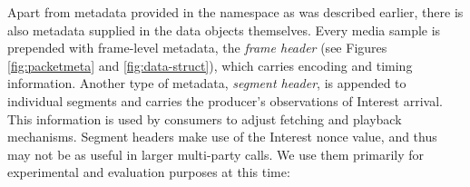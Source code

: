 \documentclass{icn/sig-alternate-2013} %
\newcommand{\ndnrtcName}{NDN-RTC} %
\begin{document}
Apart from metadata provided in the namespace as was described earlier, there is also metadata supplied in the data objects themselves.
%
Every media sample is prepended with frame-level metadata, the \textit{frame header} (see Figures \ref{fig:packetmeta} and \ref{fig:data-struct}), which carries encoding and timing information. %
Another type of metadata, \textit{segment header}, is appended to individual segments and carries the producer's observations of Interest arrival. This information is used by consumers to adjust fetching and playback mechanisms.  
Segment headers make use of the Interest nonce value, and thus may not be as useful in larger multi-party calls. We use them primarily for experimental and evaluation purposes at this time:
\end{document}
